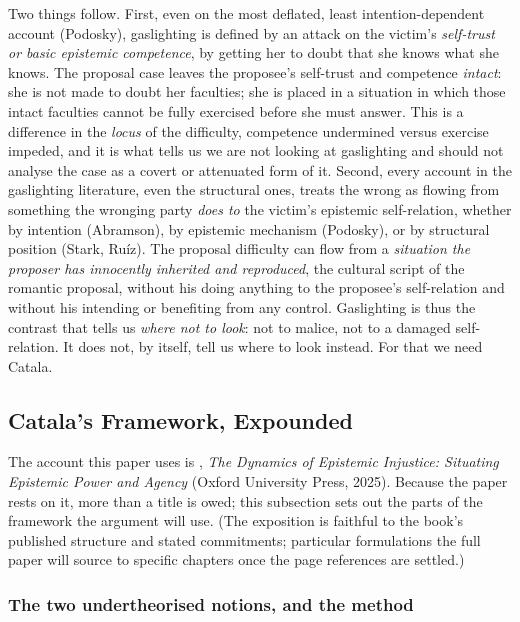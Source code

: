 \documentclass[11pt,a4paper]{article}
\begin{document}
Two things follow. First, even on the most deflated, least intention-dependent account (Podosky), gaslighting is defined by an attack on the victim's \emph{self-trust or basic epistemic competence}, by getting her to doubt that she knows what she knows. The proposal case leaves the proposee's self-trust and competence \emph{intact}: she is not made to doubt her faculties; she is placed in a situation in which those intact faculties cannot be fully exercised before she must answer. This is a difference in the \emph{locus} of the difficulty, competence undermined versus exercise impeded, and it is what tells us we are not looking at gaslighting and should not analyse the case as a covert or attenuated form of it. Second, every account in the gaslighting literature, even the structural ones, treats the wrong as flowing from something the wronging party \emph{does to} the victim's epistemic self-relation, whether by intention (Abramson), by epistemic mechanism (Podosky), or by structural position (Stark, Ruíz). The proposal difficulty can flow from a \emph{situation the proposer has innocently inherited and reproduced}, the cultural script of the romantic proposal, without his doing anything to the proposee's self-relation and without his intending or benefiting from any control. Gaslighting is thus the contrast that tells us \emph{where not to look}: not to malice, not to a damaged self-relation. It does not, by itself, tell us where to look instead. For that we need Catala.

\subsection{Catala's Framework, Expounded}\label{p06:sec:catala}

The account this paper uses is \textcite{catala2025dynamics}, \emph{The Dynamics of Epistemic Injustice: Situating Epistemic Power and Agency} (Oxford University Press, 2025). Because the paper rests on it, more than a title is owed; this subsection sets out the parts of the framework the argument will use. (The exposition is faithful to the book's published structure and stated commitments; particular formulations the full paper will source to specific chapters once the page references are settled.)

\subsubsection{The two undertheorised notions, and the method}
\end{document}
